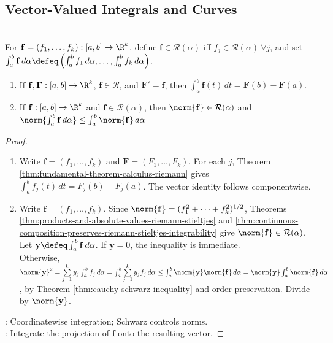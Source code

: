 \subsection{Vector-Valued Integrals and Curves}

\begin{definition} \label{def:vector-valued-riemann-stieltjes-integral} \\
For $\mathbf{f}=(f_1,\ldots,f_k):[a,b]\to\R^k$, define $\mathbf{f}\in\mathcal{R}(\alpha)$ iff $f_j\in\mathcal{R}(\alpha) \ \forall j$, and set $\int_a^b \mathbf{f}\,d\alpha \defeq \left(\int_a^b f_1\,d\alpha,\ldots,\int_a^b f_k\,d\alpha\right)$.
\end{definition}

\begin{theorem} \label{thm:vector-valued-integral-results} 
\begin{enumerate}[label=(\roman*)]
\setlength{\itemsep}{0pt}
\item If $\mathbf{f},\mathbf{F}:[a,b]\to\R^k$, $\mathbf{f}\in\mathcal{R}$, and $\mathbf{F}'=\mathbf{f}$, then $\int_a^b \mathbf{f}(t)\,dt=\mathbf{F}(b)-\mathbf{F}(a)$.
\item If $\mathbf{f}:[a,b]\to\R^k$ and $\mathbf{f}\in\mathcal{R}(\alpha)$, then $\norm{\mathbf{f}}\in\mathcal{R}(\alpha)$ and $\norm{\int_a^b \mathbf{f}\,d\alpha}\leq\int_a^b\norm{\mathbf{f}}\,d\alpha$
\end{enumerate}
\begin{proof}
\begin{enumerate}[label=(\roman*)]
\setlength{\itemsep}{0pt}
\item
Write $\mathbf{f}=(f_1,\ldots,f_k)$ and $\mathbf{F}=(F_1,\ldots,F_k)$. For each $j$, Theorem \ref{thm:fundamental-theorem-calculus-riemann} gives $\int_a^b f_j(t)\,dt=F_j(b)-F_j(a)$. The vector identity follows componentwise.
\item
Write $\mathbf{f}=(f_1,\ldots,f_k)$. Since $\norm{\mathbf{f}}=(f_1^2+\cdots+f_k^2)^{1/2}$, Theorems \ref{thm:products-and-absolute-values-riemann-stieltjes} and \ref{thm:continuous-composition-preserves-riemann-stieltjes-integrability} give $\norm{\mathbf{f}}\in\mathcal{R}(\alpha)$.\\
Let $\mathbf{y}\defeq\int_a^b\mathbf{f}\,d\alpha$. If $\mathbf{y}=0$, the inequality is immediate.\\
Otherwise, $\norm{\mathbf{y}}^2 =\sum\limits_{j=1}^{k}y_j\int_a^b f_j\,d\alpha =\int_a^b\sum\limits_{j=1}^{k}y_jf_j\,d\alpha \leq\int_a^b\norm{\mathbf{y}}\norm{\mathbf{f}}\,d\alpha =\norm{\mathbf{y}}\int_a^b\norm{\mathbf{f}}\,d\alpha$, by Theorem \ref{thm:cauchy-schwarz-inequality} and order preservation. Divide by $\norm{\mathbf{y}}$.
\end{enumerate}
: Coordinatewise integration; Schwarz controls norms.\\
: Integrate the projection of $\mathbf{f}$ onto the resulting vector.
\end{proof}
\end{theorem}


